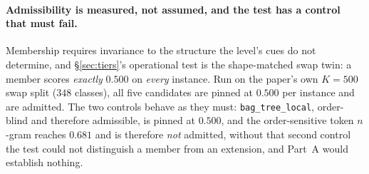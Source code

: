 \paragraph{Admissibility is measured, not assumed, and the test has a control that must fail.} Membership requires invariance to the structure the level's cues do not determine, and \S\ref{sec:tiers}'s operational test is the shape-matched swap twin: a member scores \emph{exactly} $0.500$ on \emph{every} instance. Run on the paper's own $K{=}500$ swap split ($348$ classes), all five candidates are pinned at $0.500$ per instance and are admitted. The two controls behave as they must: \texttt{bag\_tree\_local}, order-blind and therefore admissible, is pinned at $0.500$, and the order-sensitive token $n$-gram reaches $0.681$ and is therefore \emph{not} admitted, without that second control the test could not distinguish a member from an extension, and Part~A would establish nothing.

